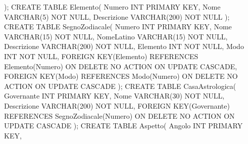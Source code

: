 );\newline\newline
CREATE TABLE Elemento(\newline
\null\qquad Numero INT PRIMARY KEY,\newline
\null\qquad Nome VARCHAR(5) NOT NULL,\newline
\null\qquad Descrizione VARCHAR(200) NOT NULL\newline
);\newline\newline
CREATE TABLE SegnoZodiacale(\newline
\null\qquad Numero INT PRIMARY KEY,\newline
\null\qquad Nome VARCHAR(15) NOT NULL,\newline
\null\qquad NomeLatino VARCHAR(15) NOT NULL,\newline
\null\qquad Descrizione VARCHAR(200) NOT NULL,\newline
\null\qquad Elemento INT NOT NULL,\newline
\null\qquad Modo INT NOT NULL,\newline
\null\qquad FOREIGN KEY(Elemento) REFERENCES Elemento(Numero)\newline
\null\qquad ON DELETE NO ACTION\newline
\null\qquad ON UPDATE CASCADE,\newline
\null\qquad FOREIGN KEY(Modo) REFERENCES Modo(Numero)\newline
\null\qquad ON DELETE NO ACTION\newline
\null\qquad ON UPDATE CASCADE\newline
);\newline\newline
CREATE TABLE CasaAstrologica(\newline
\null\qquad Governante INT PRIMARY KEY,\newline
\null\qquad Nome VARCHAR(30) NOT NULL,\newline
\null\qquad Descrizione VARCHAR(200) NOT NULL,\newline
\null\qquad FOREIGN KEY(Governante) REFERENCES SegnoZodiacale(Numero)\newline
\null\qquad ON DELETE NO ACTION\newline
\null\qquad ON UPDATE CASCADE\newline
);\newline\newline
CREATE TABLE Aspetto(\newline
\null\qquad Angolo INT PRIMARY KEY,\newline
